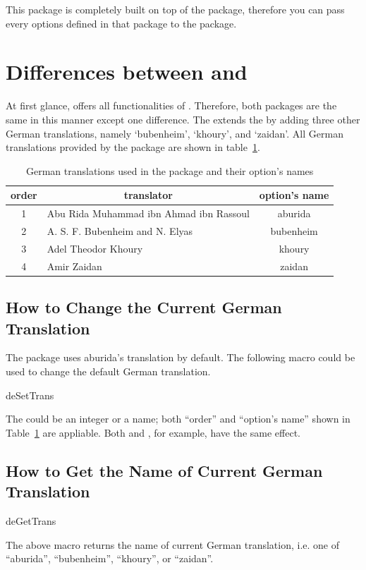 \documentclass[a4paper]{ltxdoc}
\begin{document}
This package is completely built on top of the  package, therefore you can pass every options
defined in that package to the  package. 

\section{Differences between  and }
At first glance,   offers all functionalities of . Therefore, 
both packages are the same in this manner except one difference. The  extends the  
by adding three other German translations, namely `bubenheim', `khoury', and `zaidan'. All German translations 
provided by the package are shown in table~\ref{tab:detrans}.

\begin{table}[!htbp]
\centering
\begin{tabular}{|c|l|c|}
    \toprule
    order & \multicolumn{1}{c|}{translator} & option's name \\\midrule
    1 & Abu Rida Muhammad ibn Ahmad ibn Rassoul & aburida \\
    2 & A. S. F. Bubenheim and N. Elyas & bubenheim \\
    3 & Adel Theodor Khoury & khoury \\
    4 & Amir Zaidan & zaidan \\
    \bottomrule
\end{tabular}
    \caption{German translations used in the package and their option's names}
    \label{tab:detrans}
\end{table}

\subsection{How to Change the Current German Translation}
    The  package uses aburida's translation by default. 
    The following macro could be used to change the default German translation. 
    \begin{declcs}{deSetTrans}
    \end{declcs}    
    The  could be an integer or a name; both ``order'' and ``option's name'' 
    shown in Table~\ref{tab:detrans} are appliable. Both  and , for example,
    have the same effect. 
    
\subsection{How to Get the Name of Current German Translation}
    \begin{declcs}{deGetTrans}
    \end{declcs}    
    The above macro returns the name of current German translation, i.e.  one of ``aburida'', ``bubenheim'', ``khoury'', or ``zaidan''.
\end{document}
